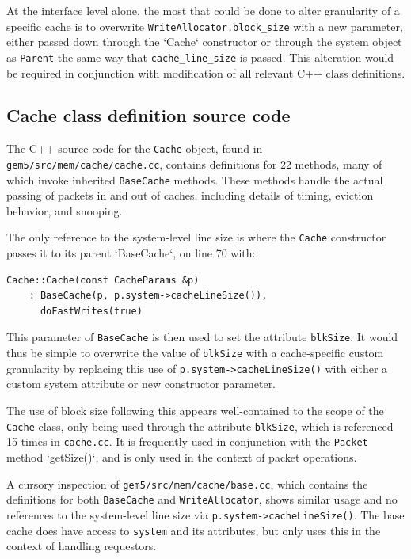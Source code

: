 \documentclass[12pt,twoside]{reedthesis}
\begin{document}
	At the interface level alone, the most that could be done to alter granularity of a specific cache is to overwrite \verb`WriteAllocator.block_size` with a new parameter, either passed down through the `Cache` constructor or through the system object as \verb`Parent` the same way that \verb`cache_line_size` is passed. This alteration would be required in conjunction with modification of all relevant C++ class definitions.

	\subsection*{Cache class definition source code}

	The C++ source code for the \verb`Cache` object, found in \verb`gem5/src/mem/cache/cache.cc`, contains definitions for 22 methods, many of which invoke inherited \verb`BaseCache` methods. These methods handle the actual passing of packets in and out of caches, including details of timing, eviction behavior, and snooping.

	The only reference to the system-level line size is where the \verb`Cache` constructor passes it to its parent `BaseCache`, on line 70 with:
	\begin{verbatim}
Cache::Cache(const CacheParams &p)
    : BaseCache(p, p.system->cacheLineSize()),
      doFastWrites(true)
	\end{verbatim}
	This parameter of \verb`BaseCache` is then used to set the attribute \verb`blkSize`. It would thus be simple to overwrite the value of \verb`blkSize` with a cache-specific custom granularity by replacing this use of \verb`p.system->cacheLineSize()` with either a custom system attribute or new constructor parameter.

	The use of block size following this appears well-contained to the scope of the \verb`Cache` class, only being used through the attribute \verb`blkSize`, which is referenced 15 times in \verb`cache.cc`. It is frequently used in conjunction with the \verb`Packet` method `getSize()`, and is only used in the context of packet operations.
	
	A cursory inspection of \verb`gem5/src/mem/cache/base.cc`, which contains the definitions for both \verb`BaseCache` and \verb`WriteAllocator`, shows similar usage and no references to the system-level line size via \verb`p.system->cacheLineSize()`. The base cache does have access to \verb`system` and its attributes, but only uses this in the context of handling requestors.
	
\end{document}
